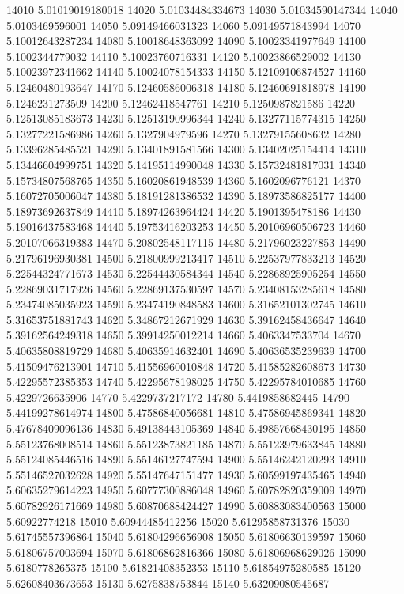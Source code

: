 {14010 5.01019019180018
14020 5.01034484334673
14030 5.01034590147344
14040 5.0103469596001
14050 5.09149466031323
14060 5.09149571843994
14070 5.10012643287234
14080 5.10018648363092
14090 5.10023341977649
14100 5.1002344779032
14110 5.10023760716331
14120 5.10023866529002
14130 5.10023972341662
14140 5.10024078154333
14150 5.12109106874527
14160 5.12460480193647
14170 5.12460586006318
14180 5.12460691818978
14190 5.1246231273509
14200 5.12462418547761
14210 5.1250987821586
14220 5.12513085183673
14230 5.12513190996344
14240 5.13277115774315
14250 5.13277221586986
14260 5.1327904979596
14270 5.13279155608632
14280 5.13396285485521
14290 5.13401891581566
14300 5.13402025154414
14310 5.13446604999751
14320 5.14195114990048
14330 5.15732481817031
14340 5.15734807568765
14350 5.16020861948539
14360 5.1602096776121
14370 5.16072705006047
14380 5.18191281386532
14390 5.18973586825177
14400 5.18973692637849
14410 5.18974263964424
14420 5.1901395478186
14430 5.19016437583468
14440 5.19753416203253
14450 5.20106960506723
14460 5.20107066319383
14470 5.20802548117115
14480 5.21796023227853
14490 5.21796196930381
14500 5.21800999213417
14510 5.22537977833213
14520 5.22544324771673
14530 5.22544430584344
14540 5.22868925905254
14550 5.22869031717926
14560 5.22869137530597
14570 5.23408153285618
14580 5.23474085035923
14590 5.23474190848583
14600 5.31652101302745
14610 5.31653751881743
14620 5.34867212671929
14630 5.39162458436647
14640 5.39162564249318
14650 5.39914250012214
14660 5.4063347533704
14670 5.40635808819729
14680 5.40635914632401
14690 5.40636535239639
14700 5.41509476213901
14710 5.41556960010848
14720 5.41585282608673
14730 5.42295572385353
14740 5.42295678198025
14750 5.42295784010685
14760 5.4229726635906
14770 5.4229737217172
14780 5.4419858682445
14790 5.44199278614974
14800 5.47586840056681
14810 5.47586945869341
14820 5.47678409096136
14830 5.49138443105369
14840 5.49857668430195
14850 5.55123768008514
14860 5.55123873821185
14870 5.55123979633845
14880 5.55124085446516
14890 5.55146127747594
14900 5.55146242120293
14910 5.55146527032628
14920 5.55147647151477
14930 5.60599197435465
14940 5.60635279614223
14950 5.60777300886048
14960 5.60782820359009
14970 5.60782926171669
14980 5.60870688424427
14990 5.60883083400563
15000 5.60922774218
15010 5.60944485412256
15020 5.61295858731376
15030 5.61745557396864
15040 5.61804296656908
15050 5.61806630139597
15060 5.61806757003694
15070 5.61806862816366
15080 5.61806968629026
15090 5.6180778265375
15100 5.61821408352353
15110 5.61854975280585
15120 5.62608403673653
15130 5.6275838753844
15140 5.63209080545687
}
